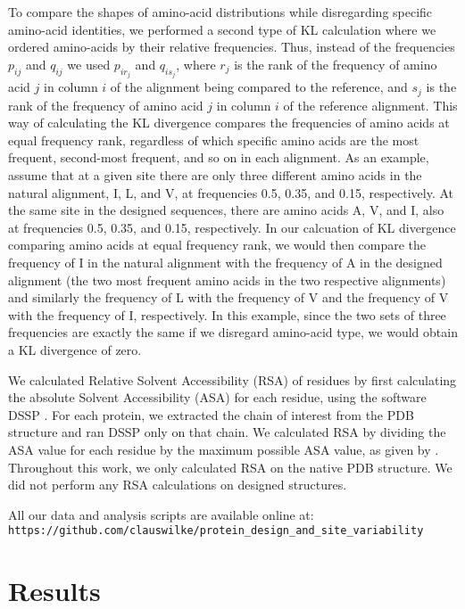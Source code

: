 \documentclass[12pt]{article}
\begin{document}
To compare the shapes of amino-acid distributions while disregarding specific amino-acid identities, we performed a second type of KL calculation where we ordered amino-acids by their relative frequencies. Thus, instead of the frequencies $p_{ij}$ and $q_{ij}$ we used $p_{ir_j}$ and $q_{is_j}$, where $r_j$ is the rank of the frequency of amino acid $j$ in column $i$ of the alignment being compared to the reference, and $s_j$ is the rank of the frequency of amino acid $j$ in column $i$ of the reference alignment. This way of calculating the KL divergence compares the frequencies of amino acids at equal frequency rank, regardless of which specific amino acids are the most frequent, second-most frequent, and so on in each alignment. {\color{blue}As an example, assume that at a given site there are only three different amino acids in the natural alignment, I, L, and V, at frequencies 0.5, 0.35, and 0.15, respectively. At the same site in the designed sequences, there are amino acids A, V, and I, also at frequencies 0.5, 0.35, and 0.15, respectively. In our calcuation of KL divergence comparing amino acids at equal frequency rank, we would then compare the frequency of I in the natural alignment with the frequency of A in the designed alignment (the two most frequent amino acids in the two respective alignments) and similarly the frequency of L with the frequency of V and the frequency of V with the frequency of I, respectively. In this example, since the two sets of three frequencies are exactly the same if we disregard amino-acid type, we would obtain a KL divergence of zero.}

We calculated Relative Solvent Accessibility (RSA) of residues by first calculating the absolute Solvent Accessibility (ASA) for each residue, using the software DSSP \citep{Kabsch1983}. For each protein, we extracted the chain of interest from the PDB structure and ran DSSP only on that chain. We calculated RSA by dividing the ASA value for each residue by the maximum possible ASA value, as given by \citet{Tien}. Throughout this work, we only calculated RSA on the native PDB structure. We did not perform any RSA calculations on designed structures.

{\color{blue}
All our data and analysis scripts are available online at:\\
\texttt{https://github.com/clauswilke/protein\_design\_and\_site\_variability}}

\section{Results}
\label{Results}
\end{document}
